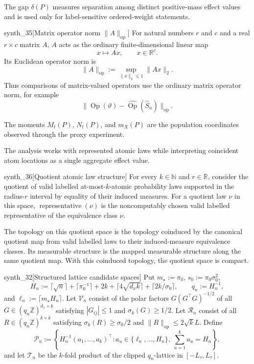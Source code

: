 The gap \(\delta(P)\) measures separation among distinct positive-mass effect values and is used only for label-sensitive ordered-weight statements.

\begin{definitionv}{synth_35}[Matrix operator norm \(\|A\|_{\mathrm{op}}\)]
For natural numbers \(r\) and \(c\) and a real \(r\times c\) matrix \(A\), \(A\) acts as the ordinary finite-dimensional linear map
\[
x\mapsto Ax,
\qquad x\in\mathbb R^c.
\]
Its Euclidean operator norm is
\[
\|A\|_{\mathrm{op}}:=\sup_{\|x\|_2\le 1}\|Ax\|_2.
\]
Thus comparisons of matrix-valued operators use the ordinary matrix operator norm, for example
\[
\|\operatorname{Op}(\vartheta)-\widehat{\operatorname{Op}}(\widehat S_n)\|_{\mathrm{op}}.
\]
\end{definitionv}

The moments \(M_t(P)\), \(N_t(P)\), and \(m_X(P)\) are the population coordinates observed through the proxy experiment.

The analysis works with represented atomic laws while interpreting coincident atom locations as a single aggregate effect value.

\begin{definitionv}{synth_36}[Quotient atomic law structure]
For every \(k\in\mathbb N\) and \(r\in\mathbb R\), consider the quotient of valid labelled at-most-\(k\)-atomic probability laws supported in the radius-\(r\) interval by equality of their induced measures.  For a quotient law \(\nu\) in this space, \(\operatorname{representative}(\nu)\) is the noncomputably chosen valid labelled representative of the equivalence class \(\nu\).

The topology on this quotient space is the topology coinduced by the canonical quotient map from valid labelled laws to their induced-measure equivalence classes.  Its measurable structure is the mapped measurable structure along the same quotient map.  With this coinduced topology, the quotient space is compact.
\end{definitionv}

\begin{definitionv}{synth_32}[Structured lattice candidate spaces]
Put \(m_\star:=\pi_0\), \(s_0:=\pi_0\sigma_0^2\), \[H_n:=\lceil\sqrt n\rceil+\lceil\pi_0^{-1}\rceil+2k+\lceil4\sqrt{d_xk}\rceil+\lceil2k/\sigma_0\rceil,\qquad q_n:=H_n^{-1},\] and \(\ell_n:=\lceil m_\star H_n\rceil\). Let \(\mathcal V_n\) consist of the polar factors \(G(G^\top G)^{-1/2}\) of all \(G\in(q_n\mathbb Z)^{d_x\times k}\) satisfying \(|G_{ij}|\le1\) and \(\sigma_k(G)\ge1/2\). Let \(\mathcal R_n\) consist of all \(R\in(q_n\mathbb Z)^{k\times k}\) satisfying \(\sigma_k(R)\ge\sigma_0/2\) and \(\lVert R\rVert_{\mathrm{op}}\le2\sqrt{k}L\). Define \[\mathcal P_n:=\left\{H_n^{-1}(a_1,\ldots,a_k)^\top:a_u\in\{\ell_n,\ldots,H_n\},\ \sum_{u=1}^k a_u=H_n\right\},\] and let \(\mathcal T_n\) be the \(k\)-fold product of the clipped \(q_n\)-lattice in \([-L_\tau,L_\tau]\).
\end{definitionv}

